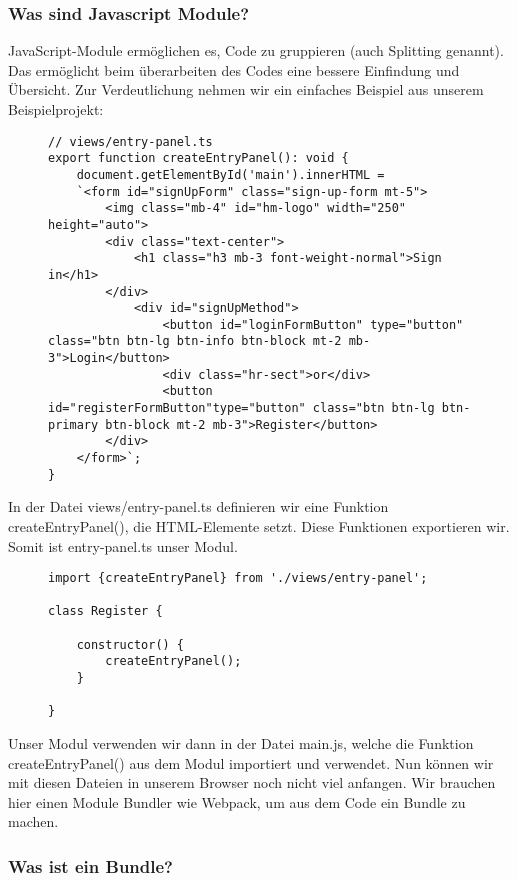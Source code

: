 \subsubsection{Was sind Javascript Module?}
JavaScript-Module ermöglichen es, Code zu gruppieren (auch \glqq{}Splitting\grqq{} genannt). Das ermöglicht beim überarbeiten des Codes eine bessere Einfindung und Übersicht. Zur Verdeutlichung nehmen wir ein einfaches Beispiel aus unserem Beispielprojekt:


\begin{figure}[H]
\begin{lstlisting}
// views/entry-panel.ts
export function createEntryPanel(): void {
    document.getElementById('main').innerHTML = 
    `<form id="signUpForm" class="sign-up-form mt-5">
        <img class="mb-4" id="hm-logo" width="250" height="auto">
        <div class="text-center">
            <h1 class="h3 mb-3 font-weight-normal">Sign in</h1>
        </div>
            <div id="signUpMethod">
                <button id="loginFormButton" type="button" class="btn btn-lg btn-info btn-block mt-2 mb-3">Login</button>
                <div class="hr-sect">or</div>
                <button id="registerFormButton"type="button" class="btn btn-lg btn-primary btn-block mt-2 mb-3">Register</button>
        </div>
    </form>`;
}
\end{lstlisting}
\end{figure}
In der Datei views/entry-panel.ts definieren wir eine Funktion createEntryPanel(), die HTML-Elemente setzt. Diese Funktionen exportieren wir. Somit ist entry-panel.ts unser Modul.

\begin{figure}[H]
\begin{lstlisting}
import {createEntryPanel} from './views/entry-panel';

class Register {

    constructor() {
        createEntryPanel();
    }
    
}
\end{lstlisting}
\end{figure}

Unser Modul verwenden wir dann in der Datei main.js, welche die Funktion createEntryPanel() aus dem Modul importiert und verwendet. Nun können wir mit diesen Dateien in unserem Browser noch nicht viel anfangen. Wir brauchen hier einen Module Bundler wie Webpack, um aus dem Code ein Bundle zu machen.

\subsubsection{Was ist ein Bundle?}

